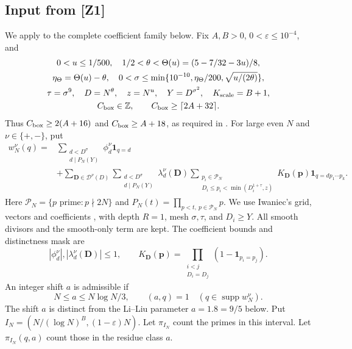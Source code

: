 \documentclass{amsart}
\numberwithin{equation}{section}
\numberwithin{table}{section}
\theoremstyle{definition}
\begin{document}
\subsection*{Input from \textup{[Z1]}}
\label{sec:z1-input}
We apply \cite[Theorem~1.2]{Z1} to the complete coefficient family below.
Fix $A,B>0$, $0<\varepsilon\le10^{-4}$, and
\[
 \begin{gathered}
 0<u\le1/500,\quad 1/2<\theta<\Theta(u)=(5-7/32-3u)/8,\\
 \eta_\Theta=\Theta(u)-\theta,\quad
 0<\sigma\le\min\{10^{-10},\eta_\Theta/200,\sqrt{u/(2\theta)}\},\\
 \tau=\sigma^9,\quad D=N^\theta,\quad z=N^u,\quad
 Y=D^{\sigma^2},\quad K_{\rm scale}=B+1,\\
 C_{\rm box}\in\mathbb Z,\qquad C_{\rm box}\ge\lceil2A+32\rceil.
 \end{gathered}
\]
Thus $C_{\rm box}\ge2(A+16)$ and $C_{\rm box}\ge A+18$,
as required in \cite[(3.24), (B.18)--(B.19)]{Z1}.
For large even $N$ and $\nu\in\{+,-\}$, put
\begin{equation*}\tag*{(W)}
\begin{split}
 w_N^\nu(q)={}&
 \sum_{\substack{d<D^\sigma\\d\mid P_N(Y)}}
       \phi_d^\nu\mathbf1_{q=d}\\
 &+\sum_{\mathbf D\in\mathcal D^\nu(D)}
 \sum_{\substack{d<D^\sigma\\d\mid P_N(Y)}}
       \lambda_d^\nu(\mathbf D)
 \sum_{\substack{p_i\in\mathcal P_N\\
       D_i\le p_i<\min(D_i^{1+\tau},z)}}
       K_{\mathbf D}(\mathbf p)\mathbf1_{q=dp_1\cdots p_k}.
\end{split}
\end{equation*}
Here $\mathcal P_N=\{p\text{ prime}:p\nmid2N\}$ and
$P_N(t)=\prod_{p<t,\ p\in\mathcal P_N}p$.
We use Iwaniec's grid, vectors and coefficients \cite[Theorem~4]{ref5},
with depth $R=1$, mesh $\sigma,\tau$, and $D_i\ge Y$.
All smooth divisors and the smooth-only term are kept.
The coefficient bounds and distinctness mask are
\[
 |\phi_d^\nu|,|\lambda_d^\nu(\mathbf D)|\le1,\qquad
 K_{\mathbf D}(\mathbf p)=
 \prod_{\substack{i<j\\D_i=D_j}}(1-\mathbf1_{p_i=p_j}).
\]
An integer shift $a$ is admissible if
\[
 N\le a\le N\log N/3,\qquad
 (a,q)=1\quad(q\in\operatorname{supp}w_N^\nu).
\]
The shift $a$ is distinct from the Li--Liu parameter $a=1.8=9/5$ below.
Put $I_N=(N/(\log N)^B,(1-\varepsilon)N)$.
Let $\pi_{I_N}$ count the primes in this interval.
Let $\pi_{I_N}(q,a)$ count those in the residue class $a$.
\end{document}
